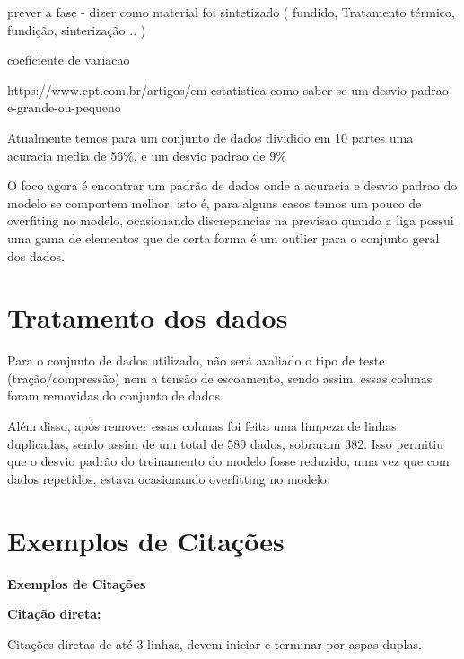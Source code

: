 prever a fase - dizer como material foi sintetizado ( fundido, Tratamento térmico, fundição, sinterização .. ) 

\pagebreak


coeficiente de variacao 

https://www.cpt.com.br/artigos/em-estatistica-como-saber-se-um-desvio-padrao-e-grande-ou-pequeno

Atualmente temos para um conjunto de dados dividido em 10 partes uma acuracia media de $ 56\% $, e um desvio padrao de $ 9 \%$

O foco agora é encontrar um padrão de dados onde a acuracia e desvio padrao do modelo se comportem melhor, isto é, para alguns casos temos um pouco de overfiting no modelo, ocasionando discrepancias na previsao quando a liga possui uma gama de elementos que de certa forma é um outlier para o conjunto geral dos dados.









\section{Tratamento dos dados}\label{sec:MAT_MET_SEC_C}

Para o conjunto de dados utilizado, não será avaliado o tipo de teste (tração/compressão) nem a tensão de escoamento, sendo assim, essas colunas foram removidas do conjunto de dados.

Além disso, após remover essas colunas foi feita uma limpeza de linhas duplicadas, sendo assim de um total de 589 dados, sobraram 382. Isso permitiu que o desvio padrão do treinamento do modelo fosse reduzido, uma vez que com dados repetidos, estava ocasionando overfitting no modelo.



\clearpage
\section{Exemplos de Citações}
{\centering\bfseries\color{red}
Exemplos de Citações
\par}

{\centering\bfseries\color{red}
Citação direta:
\par}

\bigskip

Citações diretas de até 3 linhas, devem iniciar e terminar por aspas duplas.\\

